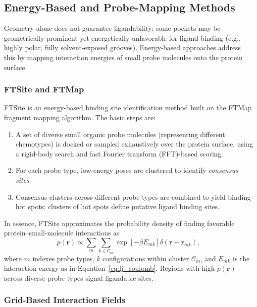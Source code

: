 \documentclass[12pt,a4paper]{article}
\begin{document}
\subsection{Energy-Based and Probe-Mapping Methods}

Geometry alone does not guarantee ligandability; some pockets may be geometrically prominent yet energetically unfavorable for ligand binding (e.g., highly polar, fully solvent-exposed grooves). Energy-based approaches address this by mapping interaction energies of small probe molecules onto the protein surface.

\subsubsection{FTSite and FTMap}

FTSite is an energy-based binding site identification method built on the FTMap fragment mapping algorithm.\cite{CH5_Ngan2012} The basic steps are:
\begin{enumerate}
    \item A set of diverse small organic probe molecules (representing different chemotypes) is docked or sampled exhaustively over the protein surface, using a rigid-body search and fast Fourier transform (FFT)-based scoring.
    \item For each probe type, low-energy poses are clustered to identify \emph{consensus sites}.
    \item Consensus clusters across different probe types are combined to yield binding hot spots; clusters of hot spots define putative ligand binding sites.
\end{enumerate}
In essence, FTSite approximates the probability density of finding favorable protein--small-molecule interactions as
\begin{equation}
p(\mathbf{r}) \propto \sum_{m} \sum_{k \in \mathcal{C}_m} \exp \left[ - \beta E_{mk} \right] \delta(\mathbf{r} - \mathbf{r}_{mk}),
\label{eq:ftsite_density}
\end{equation}
where \(m\) indexes probe types, \(k\) configurations within cluster \(\mathcal{C}_m\), and \(E_{mk}\) is the interaction energy as in Equation~\ref{eq:lj_coulomb}. Regions with high \(p(\mathbf{r})\) across diverse probe types signal ligandable sites.\cite{CH5_Ngan2012}

\subsubsection{Grid-Based Interaction Fields}
\end{document}
